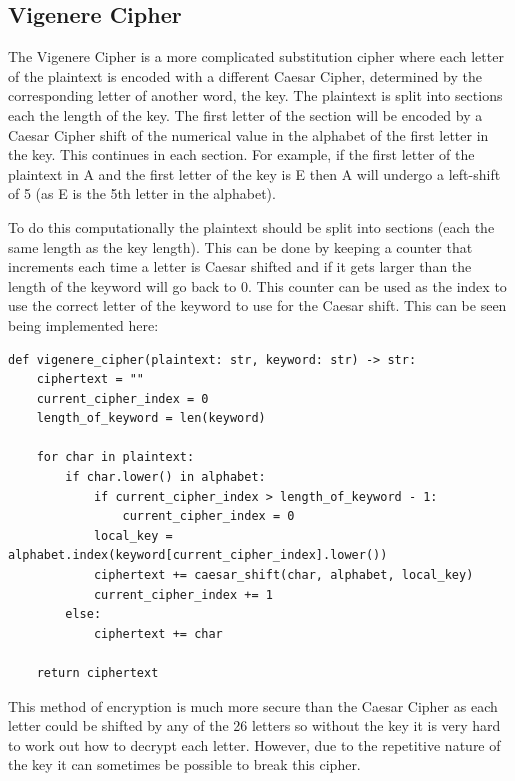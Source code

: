 \documentclass{article}
\begin{document}
\subsection{Vigenere Cipher}
The Vigenere Cipher is a more complicated substitution cipher where each letter of the plaintext is encoded with a different Caesar Cipher, determined by the corresponding letter of another word, the key. The plaintext is split into sections each the length of the key. The first letter of the section will be encoded by a Caesar Cipher shift of the numerical value in the alphabet of the first letter in the key. This continues in each section. For example, if the first letter of the plaintext in A and the first letter of the key is E then A will undergo a left-shift of 5 (as E is the 5th letter in the alphabet).\medskip


\medskip
To do this computationally the plaintext should be split into sections (each the same length as the key length). This can be done by keeping a counter that increments each time a letter is Caesar shifted and if it gets larger than the length of the keyword will go back to 0. This counter can be used as the index to use the correct letter of the keyword to use for the Caesar shift. This can be seen being implemented here:\medskip

\begin{lstlisting}
def vigenere_cipher(plaintext: str, keyword: str) -> str:
    ciphertext = ""
    current_cipher_index = 0
    length_of_keyword = len(keyword)

    for char in plaintext:
        if char.lower() in alphabet:
            if current_cipher_index > length_of_keyword - 1:
                current_cipher_index = 0
            local_key = alphabet.index(keyword[current_cipher_index].lower())
            ciphertext += caesar_shift(char, alphabet, local_key)
            current_cipher_index += 1
        else:
            ciphertext += char

    return ciphertext
\end{lstlisting}
\medskip
This method of encryption is much more secure than the Caesar Cipher as each letter could be shifted by any of the 26 letters so without the key it is very hard to work out how to decrypt each letter. However, due to the repetitive nature of the key it can sometimes be possible to break this cipher.\medskip
\end{document}
